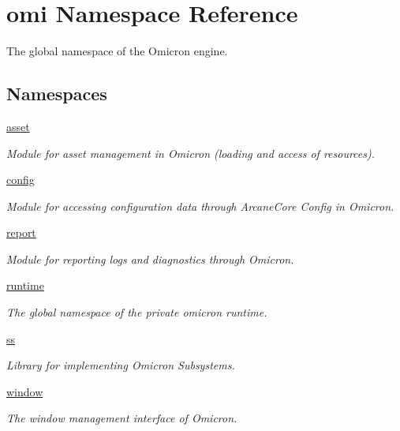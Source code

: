 \hypertarget{namespaceomi}{}\section{omi Namespace Reference}
\label{namespaceomi}


The global namespace of the Omicron engine.  


\subsection*{Namespaces}
\begin{DoxyCompactItemize}
\item 
 \hyperlink{namespaceomi_1_1asset}{asset}
\begin{DoxyCompactList}\small\item\em Module for asset management in Omicron (loading and access of resources). \end{DoxyCompactList}\item 
 \hyperlink{namespaceomi_1_1config}{config}
\begin{DoxyCompactList}\small\item\em Module for accessing configuration data through Arcane\+Core Config in Omicron. \end{DoxyCompactList}\item 
 \hyperlink{namespaceomi_1_1report}{report}
\begin{DoxyCompactList}\small\item\em Module for reporting logs and diagnostics through Omicron. \end{DoxyCompactList}\item 
 \hyperlink{namespaceomi_1_1runtime}{runtime}
\begin{DoxyCompactList}\small\item\em The global namespace of the private omicron runtime. \end{DoxyCompactList}\item 
 \hyperlink{namespaceomi_1_1ss}{ss}
\begin{DoxyCompactList}\small\item\em Library for implementing Omicron Subsystems. \end{DoxyCompactList}\item 
 \hyperlink{namespaceomi_1_1window}{window}
\begin{DoxyCompactList}\small\item\em The window management interface of Omicron. \end{DoxyCompactList}\end{DoxyCompactItemize}
